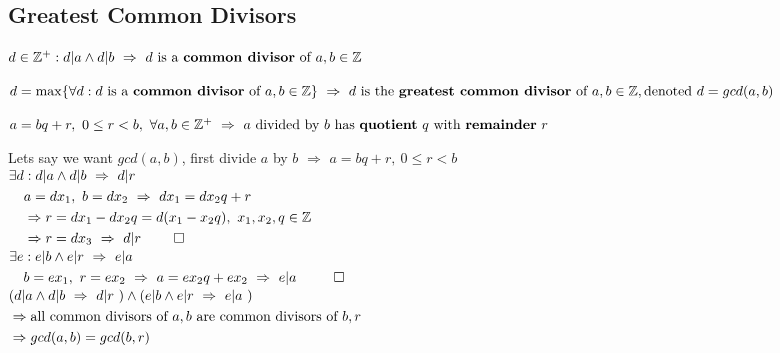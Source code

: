 \subsection{Greatest Common Divisors}
\begin{definition}
  $\ifthen{d \in \Z^+ : d|a \wedge d|b}{d \ \text{is a \textbf{common divisor} of} \ a,b \in \Z}$
\end{definition}
\begin{definition}
  $\ifthen{d = \max \{\forall d : d \ \text{is a \textbf{common divisor} of} \ a,b \in \Z\} \\}{d \ \text{is the \textbf{greatest common divisor} of} \ a,b \in \Z, \text{denoted} \ d=gcd(a,b)}$
\end{definition}
\begin{definition}
  $\ifthen{a=bq+r, \ 0 \leq r < b, \ \forall a,b \in \Z^+ \\}{\text{$a$ divided by $b$ has \textbf{quotient} $q$ with \textbf{remainder} $r$}}$
\end{definition}
Lets say we want $gcd(a,b)$, first divide $a$ by $b$ $\Rightarrow$ $a=bq+r, \ 0 \leq r < b$ \\
$\begin{aligned}
    \ifthen{\exists d & : d|a \wedge d|b}{d|r}                                      \\
                      & \ifthen{a=dx_1, \ b=dx_2}{dx_1=dx_2q+r}                     \\
                      & \Rightarrow r = dx_1-dx_2q=d(x_1-x_2q), \  x_1,x_2,q \in \Z \\
                      & \Rightarrow \ifthen{r=dx_3}{d|r} \qed
  \end{aligned}$\\
$\begin{aligned}
    \ifthen{\exists e & : e|b \wedge e|r}{e|a}                                     \\
                      & \ifthen{b=ex_1, \ r=ex_2}{\ifthen{a=ex_2q+ex_2}{e|a}} \qed
  \end{aligned}$\\
$\begin{aligned}
     & (d|a \wedge d|b \ \Rightarrow \  d|r \ ) \wedge (e|b \wedge e|r \ \Rightarrow \  e|a \ )         \\
     & \Rightarrow \text{all common divisors of $a,b$ are common divisors of $b,r$} \\
     & \Rightarrow gcd(a,b) = gcd(b,r)
  \end{aligned}$\\
